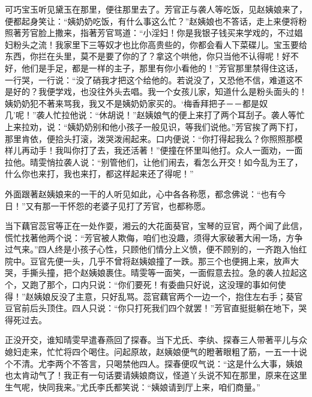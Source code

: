 \begin{parag}
    可巧宝玉听见黛玉在那里，便往那里去了。芳官正与袭人等吃饭，见赵姨娘来了，便都起身笑让：“姨奶奶吃饭，有什么事这么忙？”赵姨娘也不答话，走上来便将粉照著芳官脸上撒来，指著芳官骂道：“小淫妇！你是我银子钱买来学戏的，不过娼妇粉头之流！我家里下三等奴才也比你高贵些的，你都会看人下菜碟儿。宝玉要给东西，你拦在头里，莫不是要了你的了？拿这个哄他，你只当他不认得呢！好不好，他们是手足，都是一样的主子，那里有你小看他的！”芳官那里禁得住这话，一行哭，一行说：“没了硝我才把这个给他的。若说没了，又恐他不信，难道这不是好的？我便学戏，也没往外头去唱。我一个女孩儿家，知道什么是粉头面头的！姨奶奶犯不著来骂我，我又不是姨奶奶家买的。‘梅香拜把子－－都是奴几’呢！”袭人忙拉他说：“休胡说！”赵姨娘气的便上来打了两个耳刮子。袭人等忙上来拉劝，说：“姨奶奶别和他小孩子一般见识，等我们说他。”芳官挨了两下打，那里肯依，便拾头打滚，泼哭泼闹起来。口内便说：“你打得起我么？你照照那模样儿再动手！我叫你打了去，我还活著！”便撞在怀里叫他打。众人一面劝，一面拉他。晴雯悄拉袭人说：“别管他们，让他们闹去，看怎么开交！如今乱为王了，什么你也来打，我也来打，都这样起来还了得呢！”
\end{parag}


\begin{parag}
    外面跟著赵姨娘来的一干的人听见如此，心中各各称愿，都念佛说：“也有今日！”又有那一干怀怨的老婆子见打了芳官，也都称愿。
\end{parag}


\begin{parag}
    当下藕官蕊官等正在一处作耍，湘云的大花面葵官，宝琴的豆官，两个闻了此信，慌忙找著他两个说：“芳官被人欺侮，咱们也没趣，须得大家破著大闹一场，方争过气来。”四人终是小孩子心性，只顾他们情分上义愤，便不顾别的，一齐跑入怡红院中。豆官先便一头，几乎不曾将赵姨娘撞了一跌。那三个也便拥上来，放声大哭，手撕头撞，把个赵姨娘裹住。晴雯等一面笑，一面假意去拉。急的袭人拉起这个，又跑了那个，口内只说：“你们要死！有委曲只好说，这没理的事如何使得！”赵姨娘反没了主意，只好乱骂。蕊官藕官两个一边一个，抱住左右手；葵官豆官前后头顶住。四人只说：“你只打死我们四个就罢！”芳官直挺挺躺在地下，哭得死过去。
\end{parag}


\begin{parag}
    正没开交，谁知晴雯早遣春燕回了探春。当下尤氏、李纨、探春三人带著平儿与众媳妇走来，忙忙将四个喝住。问起原故，赵姨娘便气的瞪著眼粗了筋，一五一十说个不清。尤李两个不答言，只喝禁他四人。探春便叹气说：“这是什么大事，姨娘也太肯动气了！我正有一句话要请姨娘商议，怪道丫头说不知在那里，原来在这里生气呢，快同我来。”尤氏李氏都笑说：“姨娘请到厅上来，咱们商量。”
\end{parag}


